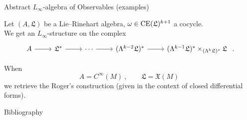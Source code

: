 \documentclass[beamer,10pt]{standalone}
\begin{document}
\begin{frame}[fragile]{Abstract {$L_\infty$}-algebra of Observables (examples)}

  \begin{exblock}
    Let $(A, \mathfrak{L})$ be a Lie--Rinehart algebra, $\omega \in \mathrm{CE}(\mathfrak{L})^{k+1}$ a cocycle.
    \\
    We get an $L_\infty$-structure on the complex
	\begin{displaymath}
		\begin{tikzcd}[]
			A \arrow[r] &
			\mathfrak{L}^* \arrow[r] &
			\cdots \arrow[r] &
			(\Lambda^{k-2} \mathfrak{L})^* \arrow[r] &
			(\Lambda^{k-1} \mathfrak{L})^* \times_{(\Lambda^k \mathfrak{L})^*} \mathfrak{L}
		\end{tikzcd}~.
	\end{displaymath}
\end{exblock}
  \vfill\pause

\begin{exblock} 
	When 
   $$ A=C^\infty(M)~, \qquad  \mathfrak{L}=\mathfrak{X}(M)$$
   we retrieve the Roger's construction (given in the context of closed differential forms).
\end{exblock}

\end{frame}




\ifstandalone
\begin{frame}[t,allowframebreaks]{Bibliography}
	\printbibliography
\end{frame}
\fi



\end{document}
